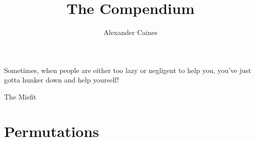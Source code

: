 \documentclass[11pt]{book}
\title{{\bf The Compendium}}
\author{Alexander Caines}
\begin{document}
\maketitle

\newpage
\epigraph{Sometimes, when people are either too lazy or negligent to help you, you've just
gotta hunker down and help yourself!}{The Misfit}
\newpage
\tableofcontents
\newpage
{}
\section{Permutations}
\end{document}
